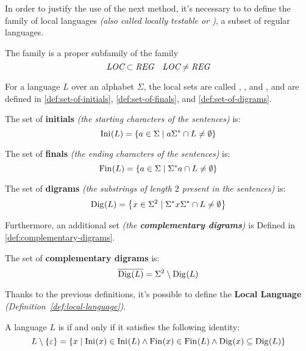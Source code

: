 \documentclass[english]{article}
\begin{document}
In order to justify the use of the next method, it's necessary to to define the family of local languages \textit{(also called locally testable or \LOC)}, a subset of regular languages.

The \LOC family is a proper subfamily of the \REG family
\[ \textit{LOC} \subset \textit{REG} \quad \textit{LOC} \neq \textit{REG} \]

For a language \(L\) over an alphabet \(\Sigma\), the local sets are called \Ini, \Fin, and \Dig, and are defined in \ref{def:set-of-initials}, \ref{def:set-of-finals}, and \ref{def:set-of-digrams}.

\begin{definition}
  \label{def:set-of-initials}
  The set of \textbf{initials} \textit{(the starting characters of the sentences)} is:
  \[ \text{Ini}\hspace{0.1ex}(L) = \left\{ a \in \Sigma \mid a \Sigma^\ast \cap L \neq \emptyset \right\} \]
\end{definition}

\begin{definition}
  \label{def:set-of-finals}
  The set of \textbf{finals} \textit{(the ending characters of the sentences)} is:
  \[ \text{Fin}\hspace{0.1ex}(L) = \left\{ a \in \Sigma \mid \Sigma^\ast a \cap L \neq \emptyset \right\} \]
\end{definition}

\begin{definition}
  \label{def:set-of-digrams}
  The set of \textbf{digrams} \textit{(the substrings of length \(2\) present in the sentences)} is:
  \[ \text{Dig}\hspace{0.1ex}(L) = \left\{ x \in \Sigma^2 \mid \Sigma^\ast x \Sigma^\ast \cap L \neq \emptyset \right\} \]
\end{definition}

Furthermore, an additional set \textit{(the \textbf{complementary digrams})} is Defined in \ref{def:complementary-digrams}.

\begin{definition}
  \label{def:complementary-digrams}
  The set of \textbf{complementary digrams} is:
  \[ \overline{\text{Dig}\hspace{0.1ex}(L)} = \Sigma^2 \setminus \text{Dig}\hspace{0.1ex}(L) \]
\end{definition}

\bigskip
Thanks to the previous definitions, it's possible to define the \textbf{Local Language} \textit{(Definition~\ref{def:local-language})}.

\begin{definition}
  \label{def:local-language}
  A language \(L\) is \LOC if and only if it satisfies the following identity:
  \[ L \setminus \left\{ \varepsilon \right\} = \left\{ x \mid \text{Ini}\hspace{0.1ex}(x) \in \text{Ini}\hspace{0.1ex}(L) \land \text{Fin}\hspace{0.1ex}(x) \in \text{Fin}\hspace{0.1ex}(L) \land \text{Dig}\hspace{0.1ex}(x) \subseteq \text{Dig}\hspace{0.1ex}(L) \right\} \]
\end{definition}
\end{document}
